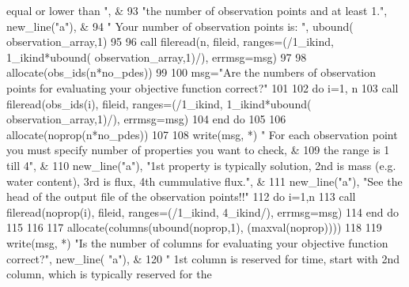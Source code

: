 \begin{DoxyCode}
{       equal or lower than "}\textcolor{comment}{, &}
93 \textcolor{comment}{          }\textcolor{stringliteral}{"the number of observation points and at least 1."}, new\_line(\textcolor{stringliteral}{"a"}\textcolor{comment}{), &}
94 \textcolor{comment}{          }\textcolor{stringliteral}{"   Your number of observation points is: "},   ubound(
      observation_array\textcolor{comment}{,1)}
95 \textcolor{comment}{      }
96 \textcolor{comment}{      }\textcolor{keyword}{call }fileread(n, fileid, ranges=(/1\_ikind, 1\_ikind*ubound(
      observation_array\textcolor{comment}{,1)/), errmsg=msg)}
97 \textcolor{comment}{      }
98 \textcolor{comment}{      }\textcolor{keyword}{allocate}(obs\_ids(n*no\_pdes))
99       
100       msg=\textcolor{stringliteral}{"Are the numbers of observation points for evaluating your objective function correct?"}
101       
102       \textcolor{keywordflow}{do} i=1, n
103         \textcolor{keyword}{call }fileread(obs\_ids(i), fileid, ranges=(/1\_ikind, 1\_ikind*ubound\textcolor{comment}{(
      observation_array,1)/), errmsg=msg)}
104 \textcolor{comment}{}\textcolor{keywordflow}{      end do}
105 
106       \textcolor{keyword}{allocate}(noprop(n*no\_pdes))
107       
108       \textcolor{keyword}{write}(msg, *) \textcolor{stringliteral}{"   For each observation point you must specify number of properties you want to check,
       &}
109 \textcolor{stringliteral}{}\textcolor{stringliteral}{          the range is 1 till 4"}, &
110         new\_line(\textcolor{stringliteral}{"a"}), \textcolor{stringliteral}{"1st property is typically solution, 2nd is mass (e.g. water content), 3rd is flux,
       4th cummulative flux."}\textcolor{comment}{, & }
111 \textcolor{comment}{        new\_line(}\textcolor{stringliteral}{"a"}), \textcolor{stringliteral}{"See the head of the output file of the observation points!!"}\textcolor{comment}{ }
112 \textcolor{comment}{      }\textcolor{keywordflow}{do} i=1,n        
113         \textcolor{keyword}{call }fileread(noprop(i), fileid, ranges=(/1\_ikind, 4\_ikind/), errmsg\textcolor{comment}{=msg)}
114 \textcolor{comment}{}\textcolor{keywordflow}{      end do} 
115       
116       
117       \textcolor{keyword}{allocate}(columns(ubound(noprop,1), (maxval(noprop))))
118       
119       \textcolor{keyword}{write}(msg, *) \textcolor{stringliteral}{"Is the number of columns for evaluating your objective function correct?"}\textcolor{comment}{, new\_line(}\textcolor{stringliteral}{
      "a"}\textcolor{comment}{), &}
120 \textcolor{comment}{          }\textcolor{stringliteral}{" 1st column is reserved for time, start with 2nd column, which is typically reserved for the
}
\end{DoxyCode}
